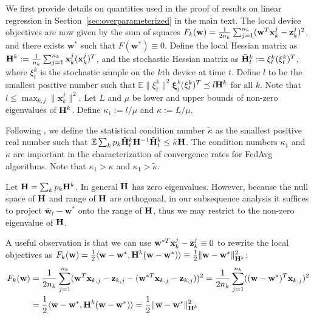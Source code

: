 We first provide details on quantities used in the proof of results on linear regression in Section~\ref{sec:overparameterized} in the main text. The local device objectives are now given by the sum of squares {\small$F_{k}(\mathbf{w})=\frac{1}{2n_{k}}\sum_{j=1}^{n_{k}}(\mathbf{w}^{T}\mathbf{x}_{k}^{j}-{\mathbf{z}}_{k}^{j})^{2}$},
and there exists $\mathbf{w}^{\ast}$ such that $F(\mathbf{w}^{\ast})\equiv0$. 
Define the local Hessian matrix as ${\mathbf{H}}^{k}:=\frac{1}{n_{k}}\sum_{j=1}^{n_{k}}\mathbf{x}_{k}^{j}(\mathbf{x}_{k}^{j})^{T}$, and the stochastic Hessian matrix as $\tilde{{\mathbf{H}}}_{t}^{k}:=\xi_{t}^{k}(\xi_{t}^{k})^{T}$, where $\xi_{t}^{k}$ is the stochastic sample on the $k$th device at
time $t$. Define $l$ to be the smallest positive number such that $\mathbb{E}\|\xi_{t}^{k}\|^{2}$$\mathbf{\xi}_{t}^{k}$($\mathbf{\xi}_{t}^{k})^{T}\preceq l{\mathbf{H}}^{k}$ for all $k$. Note that $l\leq\max_{k,j}\|\mathbf{x}_{k}^{j}\|^{2}$.
Let $L$ and $\mu$ be lower and upper bounds of non-zero eigenvalues
of ${\mathbf{H}}^{k}$. Define $\kappa_{1}:=l/\mu$ and $\kappa:=L/\mu$. 

Following
\cite{liu2018accelerating,jain2017accelerating}, we define the statistical
condition number $\tilde{\kappa}$ as the smallest positive real number
such that $\mathbb{E}\sum_{k}p_{k}\tilde{{\mathbf{H}}}_{t}^{k}{\mathbf{H}}^{-1}\tilde{{\mathbf{H}}}_{t}^{k}\leq\tilde{\kappa}{\mathbf{H}}$. 
The condition numbers $\kappa_{1}$ and $\tilde{\kappa}$
are important in the characterization of convergence rates for FedAvg
algorithms. Note that $\kappa_{1}>\kappa$ and $\kappa_{1}>\tilde{\kappa}$.


Let ${\mathbf{H}}=\sum_{k}p_k{\mathbf{H}}^k$. In general ${\mathbf{H}}$ has zero eigenvalues. However, because the null space
of ${\mathbf{H}}$ and range of ${\mathbf{H}}$ are orthogonal, in our subsequence analysis
it suffices to project $\overline{\mathbf{w}}_{t}-\mathbf{w}^{\ast}$
onto the range of ${\mathbf{H}}$, thus we may restrict to the non-zero eigenvalue
of ${\mathbf{H}}$. 

A useful observation is that we can use $\mathbf{w}^{\ast T}\mathbf{x}_{k}^{j}-{\mathbf{z}}_{k}^{j}\equiv0$
to rewrite the local objectives as $F_{k}(\mathbf{w})=\frac{1}{2}\langle\mathbf{w}-\mathbf{w}^{\ast},{\mathbf{H}}^{k}(\mathbf{w}-\mathbf{w}^{\ast})\rangle\equiv\frac{1}{2}\|\mathbf{w}-\mathbf{w}^{\ast}\|_{{\mathbf{H}}^{k}}^{2}$:
\begin{align*}
F_{k}({\mathbf{w}}) & =\frac{1}{2n_{k}}\sum_{j=1}^{n_{k}}({\mathbf{w}}^{T}{\mathbf{x}}_{k,j}-{\mathbf{z}}_{k,j}-({\mathbf{w}}^{\ast T}{\mathbf{x}}_{k,j}-{\mathbf{z}}_{k,j}))^{2}=\frac{1}{2n_{k}}\sum_{j=1}^{n_{k}}(({\mathbf{w}}-{\mathbf{w}}^{\ast})^{T}{\mathbf{x}}_{k,j})^{2}\\
& =\frac{1}{2}\langle {\mathbf{w}}-{\mathbf{w}}^{\ast},{\mathbf{H}}^{k}({\mathbf{w}}-{\mathbf{w}}^{\ast})\rangle=\frac{1}{2}\|{\mathbf{w}}-{\mathbf{w}}^{\ast}\|_{{\mathbf{H}}^{k}}^{2}
\end{align*}

